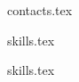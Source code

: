 \documentclass[11pt]{article}
\begin{document}
{contacts.tex}


{skills.tex}


{skills.tex}
\end{document}
